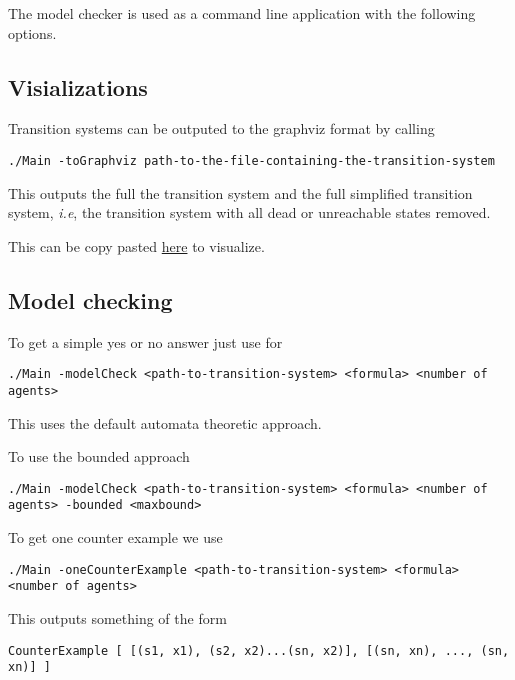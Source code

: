 \documentclass[11pt]{article}
\begin{document}
The model checker is used as a command line application with the following
options.

\subsection{Visializations}
\label{sec:orgf8a45c4}

Transition systems can be outputed to the graphviz format by calling

\begin{verbatim}
./Main -toGraphviz path-to-the-file-containing-the-transition-system
\end{verbatim}

This outputs the full the transition system and the full simplified transition
system, \emph{i.e}, the transition system with all dead or unreachable states
removed.

This can be copy pasted \href{http:webgraphviz.com}{here} to visualize. 

\subsection{Model checking}
\label{sec:org75f5e41}

To get a simple yes or no answer just use for

\begin{verbatim}
./Main -modelCheck <path-to-transition-system> <formula> <number of agents>
\end{verbatim}

This uses the default automata theoretic approach.

To use the bounded approach

\begin{verbatim}
./Main -modelCheck <path-to-transition-system> <formula> <number of agents> -bounded <maxbound>
\end{verbatim}

To get one counter example we use

\begin{verbatim}
./Main -oneCounterExample <path-to-transition-system> <formula> <number of agents>
\end{verbatim}

This outputs something of the form

\begin{verbatim}
CounterExample [ [(s1, x1), (s2, x2)...(sn, x2)], [(sn, xn), ..., (sn, xn)] ]
\end{verbatim}
\end{document}
